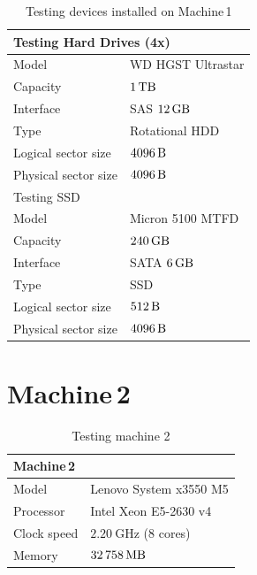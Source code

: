 \documentclass[
  color, %
  table, %
  lof,   %
  lot,   %
]{fithesis3}
\begin{document}
\begin{table}[!htb]
\centering
\begin{tabular}{|l|l|}
\hline
   \multicolumn{2}{|l|}{Testing Hard Drives (4x)} \\ \hline %
    Model & WD HGST Ultrastar\\
    \hline
    Capacity & $\SI{1}{\tera\byte}$  \\
    \hline
    Interface & SAS $\SI{12}{\giga\byte}$  \\
    \hline
    Type & Rotational HDD \\
    \hline    
    Logical sector size & $\SI{4096}{\byte}$ \\    
    \hline    
    Physical sector size & $\SI{4096}{\byte}$ \\
    \hline
    \hline
    \multicolumn{2}{|l|}{Testing SSD } \\ \hline %
     Model & Micron 5100 MTFD \\
    \hline
     Capacity & $\SI{240}{\giga\byte}$  \\
    \hline
    Interface & SATA $\SI{6}{\giga\byte}$  \\
    \hline
    Type & SSD \\
    \hline    
    Logical sector size & $\SI{512}{\byte}$ \\    
    \hline    
     Physical sector size & $\SI{4096}{\byte}$ \\
    \hline
 
\end{tabular}
\caption{Testing devices installed on Machine\,1}
\end{table}

\clearpage
\section{Machine\,2}
\label{hw:2}
\begin{table}[!htb]
\centering
\begin{tabular}{|l|l|}
\hline
   \multicolumn{2}{|l|}{Machine\,2} \\ \hline %
    Model & Lenovo System x3550 M5\\
    \hline
    Processor & Intel Xeon E5-2630 v4  \\
    \hline
    Clock speed & $\SI{2.20}{\giga\hertz}$ (8 cores) \\
    \hline
    Memory & $\SI{32758}{\mega\byte}$ \\
    \hline
\end{tabular}
\caption{Testing machine 2}
\end{table}
\end{document}
